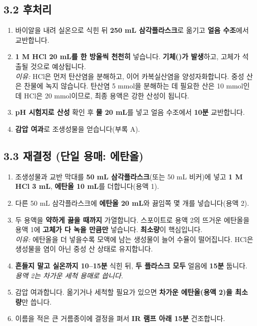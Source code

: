 \documentclass[10pt,a4paper]{article}
\begin{document}
\subsection*{3.2 후처리}
\begin{enumerate}[leftmargin=7mm,itemsep=1.2mm,label=\cbox\ \arabic*.,resume]
\item 바이알을 내려 실온으로 식힌 뒤 \textbf{250 mL 삼각플라스크}로 옮기고 \textbf{얼음 수조}에서 교반합니다.
\item \textbf{1 M HCl 20 mL를 한 방울씩 천천히} 넣습니다. \textbf{기체()가 발생}하고, 고체가 석출될 것으로 예상됩니다.\\
{\footnotesize \emph{이유:} HCl은 먼저 탄산염을 분해하고, 이어 카복실산염을 양성자화합니다. 중성 산은 찬물에 녹지 않습니다. 탄산염 5 mmol을 분해하는 데 필요한 산은 10 mmol인데 HCl은 20 mmol이므로, 최종 용액은 강한 산성이 됩니다.}
\item \textbf{pH 시험지로 산성} 확인 후 \textbf{물 20 mL}를 넣고 얼음 수조에서 \textbf{10분} 교반합니다.
\item \textbf{감압 여과}로 조생성물을 얻습니다(부록 A).
\end{enumerate}

\subsection*{3.3 재결정 (단일 용매: 에탄올)}
\begin{enumerate}[leftmargin=7mm,itemsep=1.2mm,label=\cbox\ \arabic*.,resume]
\item 조생성물과 교반 막대를 \textbf{50 mL 삼각플라스크}(또는 50 mL 비커)에 넣고 \textbf{1 M HCl 3 mL}, \textbf{에탄올 10 mL}를 더합니다(용액 1).
\item 다른 50 mL 삼각플라스크에 \textbf{에탄올 20 mL}와 끓임쪽 몇 개를 넣습니다(용액 2).
\item 두 용액을 \textbf{약하게 끓을 때까지} 가열합니다. 스포이트로 용액 2의 뜨거운 에탄올을 용액 1에 \textbf{고체가 다 녹을 만큼만} 넣습니다. \textbf{최소량}이 핵심입니다.\\
{\footnotesize \emph{이유:} 에탄올을 더 넣을수록 모액에 남는 생성물이 늘어 수율이 떨어집니다. HCl은 생성물을 염이 아닌 중성 산 상태로 유지합니다.}
\item \textbf{흔들지 말고 실온까지 10--15분} 식힌 뒤, \textbf{두 플라스크 모두} 얼음에 \textbf{15분} 둡니다. \emph{용액 2는 차가운 세척 용매로 씁니다.}
\item 감압 여과합니다. 옮기거나 세척할 필요가 있으면 \textbf{차가운 에탄올(용액 2)을 최소량}만 씁니다.
\item 이름을 적은 큰 거름종이에 결정을 펴서 \textbf{IR 램프 아래 15분} 건조합니다.
\end{enumerate}
\end{document}
